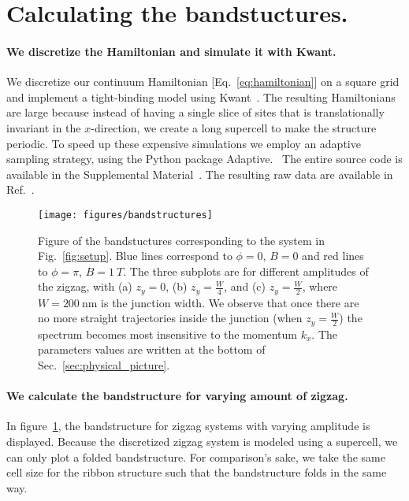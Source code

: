 \documentclass[english, twocolumn, 10pt, aps, superscriptaddress, floatfix, prb, citeautoscript]{revtex4-1}
\renewcommand{\comment}[2]{#2}
\renewcommand{\comment}{\paragraph}
\begin{document}
\section{Calculating the bandstuctures.}\label{sec:bandstuctures}

\comment{We discretize the Hamiltonian and simulate it with Kwant.}
We discretize our continuum Hamiltonian [Eq.~\eqref{eq:hamiltonian}] on a square grid and implement a tight-binding model using Kwant~\cite{groth_kwant:_2014}.
The resulting Hamiltonians are large because instead of having a single slice of sites that is translationally invariant in the $x$-direction, we create a long supercell to make the structure periodic.
To speed up these expensive simulations we employ an adaptive sampling strategy, using the Python package Adaptive.~\cite{adaptive}
The entire source code is available in the Supplemental Material~\cite{supp}.  %
The resulting raw data are available in Ref.~.  %

\begin{figure}[!htb]
\texttt{[image: figures/bandstructures]}
\caption{Figure of the bandstuctures corresponding to the system in Fig.~\ref{fig:setup}.
Blue lines correspond to $\phi=0$, $B=0$ and red lines to $\phi=\pi$, $B = \SI{1}{T}$.
The three subplots are for different amplitudes of the zigzag, with (a) $z_y=0$, (b) $z_y=\frac{W}{4}$, and (c) $z_y=\frac{W}{2}$, where $W=\SI{200}{\nm}$ is the junction width.
We observe that once there are no more straight trajectories inside the junction (when $z_y=\frac{W}{2}$) the spectrum becomes most insensitive to the momentum $k_x$.
The parameters values are written at the bottom of Sec.~\ref{sec:physical_picture}.\label{fig:bandstuctures}}
\end{figure}

\comment{We calculate the bandstructure for varying amount of zigzag.}
In figure~\ref{fig:bandstuctures}, the bandstructure for zigzag systems with varying amplitude is displayed.
Because the discretized zigzag system is modeled using a supercell, we can only plot a folded bandstructure.
For comparison's sake, we take the same cell size for the ribbon structure such that the bandstructure folds in the same way.
\end{document}
